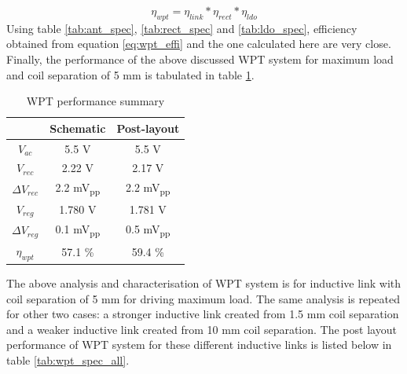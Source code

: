 \documentclass[UKenglish]{ifimaster}  %
\begin{document}
\begin{equation} \label{eq:wpt_effi} 
\eta_{wpt} = \eta_{link}*\eta_{rect}*\eta_{ldo}
\end{equation}
Using table \ref{tab:ant_spec}, \ref{tab:rect_spec} and \ref{tab:ldo_spec}, efficiency obtained from equation \ref{eq:wpt_effi} 
and the one calculated here are very close.\\

Finally, the performance of the above discussed WPT system for maximum load and coil separation of 5 mm is tabulated in 
table \ref{tab:wpt_spec}. 


\begin{table}[H]
\caption{WPT performance summary} 
\begin{center}
\begin{tabular}{c|c|c}
\hline \hline
					& \textbf{Schematic}	& \textbf{Post-layout} 	\\
\hline \hline
$V_{ac}$			& 5.5 \si{\volt}		& 5.5 \si{\volt} \\ \hline
$V_{rec}$ 			& 2.22 \si{\volt}		& 2.17 V	\\ \hline
$\Delta V_{rec}$	& 2.2 \si{\milli\volt}\textsubscript{pp} & 2.2 \si{\milli\volt}\textsubscript{pp}		\\ \hline
$V_{reg}$			& 1.780	\si{\volt}		& 1.781 \si{\volt}			\\ \hline
$\Delta V_{reg}$ 	& 0.1 \si{\milli\volt}\textsubscript{pp} & 0.5 \si{\milli\volt}\textsubscript{pp}		\\ \hline
$\eta_{wpt}$		& 57.1 \%				& 59.4 \%		\\ 
 
\hline \hline
\end{tabular}
\end{center}
\label{tab:wpt_spec}
\end{table}%

The above analysis and characterisation of WPT system is for inductive link with coil separation of 5 mm for driving maximum load. The same analysis is repeated for other two cases: a stronger inductive link created from 1.5 mm coil separation and a weaker inductive link created from 10 mm coil separation. The post layout performance of WPT system for these different inductive links is listed below in table \ref{tab:wpt_spec_all}.
\end{document}
